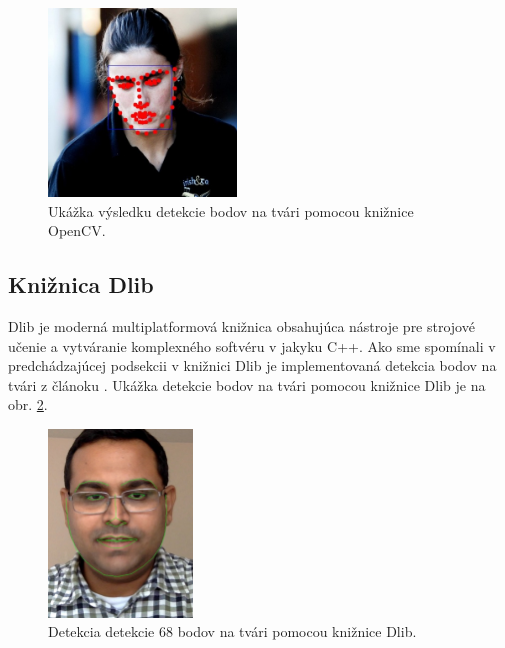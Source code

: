 \begin{figure}[H]
	\begin{center}
		\includegraphics[height=5cm]{pics/openCv.jpg}
		\caption{Ukážka výsledku detekcie bodov na tvári pomocou knižnice OpenCV.
		 \cite{openCv}}
		\label{pic-openCv}
	\end{center}
\end{figure}

\subsection{Knižnica Dlib} \label{DlibNadpis}
Dlib\cite{dlib} je moderná multiplatformová knižnica obsahujúca nástroje pre strojové učenie a vytváranie komplexného softvéru v jakyku C++. 
Ako sme spomínali v pred\-chá\-dza\-jú\-cej podsekcii v knižnici Dlib je implementovaná detekcia bodov na tvári z článoku \cite{kazemi2014one}. 
Ukážka detekcie bodov na tvári pomocou knižnice Dlib je na obr. \ref{pic-dlibUkazka}.

\begin{figure}[H]
	\begin{center}
		\includegraphics[height=5cm]{pics/dlib.jpg}
		\caption{Detekcia detekcie 68 bodov na tvári pomocou knižnice Dlib.
		 \cite{dlibUkazka}}
		\label{pic-dlibUkazka}
	\end{center}
\end{figure}

